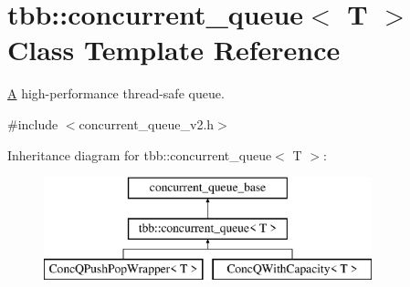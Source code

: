 \hypertarget{classtbb_1_1concurrent__queue}{}\section{tbb\+:\+:concurrent\+\_\+queue$<$ T $>$ Class Template Reference}
\label{classtbb_1_1concurrent__queue}


\hyperlink{structA}{A} high-\/performance thread-\/safe queue.  




{\ttfamily \#include $<$concurrent\+\_\+queue\+\_\+v2.\+h$>$}

Inheritance diagram for tbb\+:\+:concurrent\+\_\+queue$<$ T $>$\+:\begin{figure}[H]
\begin{center}
\leavevmode
\includegraphics[height=3.000000cm]{classtbb_1_1concurrent__queue}
\end{center}
\end{figure}
